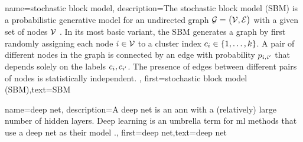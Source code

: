 {name={stochastic block model},
	description={The stochastic block model (SBM) is a 
		probabilistic generative model for an undirected graph $\mathcal{G} = \big( \mathcal{V}, \mathcal{E} \big)$ 
		with a given set of nodes $\mathcal{V}$ \cite{AbbeSBM2018}. In its most basic variant, 
		the SBM generates a graph by first randomly assigning each node $i \in \mathcal{V}$ to 
		a cluster index $c_{i} \in \{1,\ldots,k\}$. A pair of different nodes in the 
		graph is connected by an edge with probability $p_{i,i'}$ that depends 
		solely on the labels $c_{i}, c_{i'}$. 
		The presence of edges between different pairs of 
		nodes is statistically independent. },
	first={stochastic block model (SBM)},text={SBM} 
}

{name={deep net},
	description={A deep net is an \gls{ann} with a (relatively) large number of 
	hidden layers. Deep learning is an umbrella term for \gls{ml} methods that use a deep 
	net as their model \cite{Goodfellow-et-al-2016}.},
	first={deep net},text={deep net} 
}

\newcommand{\gaussiancenter}{3}

